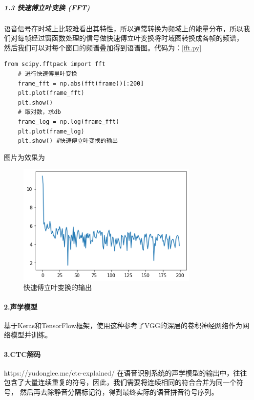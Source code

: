 \documentclass[12pt,a4paper,fancyhdr,openany,oneside]{ctexbook}
\begin{document}
\subparagraph{1.3 快速傅立叶变换 (FFT)}
语音信号在时域上比较难看出其特性，所以通常转换为频域上的能量分布，所以我们对每帧经过窗函数处理的信号做快速傅立叶变换将时域图转换成各帧的频谱，
然后我们可以对每个窗口的频谱叠加得到语谱图。代码为：\ref{fft.py}
\begin{lstlisting}[style=Python, caption={fft.py}, label={fft.py}]
    from scipy.fftpack import fft
    # 进行快速傅里叶变换
    frame_fft = np.abs(fft(frame))[:200]
    plt.plot(frame_fft)
    plt.show()
    # 取对数，求db
    frame_log = np.log(frame_fft)
    plt.plot(frame_log)
    plt.show() #快速傅立叶变换的输出
\end{lstlisting}
图片为效果为
\begin{figure}[htbp]
    \centering
        \includegraphics[width=0.8\textwidth]{resource/img/fft.png}
        \caption{快速傅立叶变换的输出}
        \label{fft.png}
\end{figure}





\paragraph{2.声学模型}
基于Keras和TensorFlow框架，使用这种参考了VGG的深层的卷积神经网络作为网络模型并训练。
\paragraph{3.CTC解码}https://yudonglee.me/ctc-explained/
在语音识别系统的声学模型的输出中，往往包含了大量连续重复的符号，因此，我们需要将连续相同的符合合并为同一个符号，
然后再去除静音分隔标记符，得到最终实际的语音拼音符号序列。\cite{hannun2017sequence}
\end{document}
